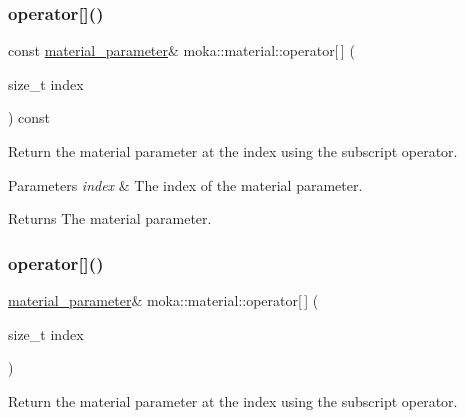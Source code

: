 \mbox{\label{classmoka_1_1material_acf1a2885fe704ce6684080c52f106f70}} 
\subsubsection{\texorpdfstring{operator[]()}{operator[]()}\hspace{0.1cm}{\footnotesize\ttfamily [1/3]}}
{\footnotesize\ttfamily const \mbox{\hyperlink{structmoka_1_1material__parameter}{material\+\_\+parameter}}\& moka\+::material\+::operator\mbox{[}$\,$\mbox{]} (\begin{DoxyParamCaption}\item[{size\+\_\+t}]{index }\end{DoxyParamCaption}) const}



Return the material parameter at the index using the subscript operator. 


\begin{DoxyParams}{Parameters}
{\em index} & The index of the material parameter. \\
\hline
\end{DoxyParams}
\begin{DoxyReturn}{Returns}
The material parameter. 
\end{DoxyReturn}
\mbox{\label{classmoka_1_1material_a9232eb8fae1ebace716db92e7bd118af}} 
\subsubsection{\texorpdfstring{operator[]()}{operator[]()}\hspace{0.1cm}{\footnotesize\ttfamily [2/3]}}
{\footnotesize\ttfamily \mbox{\hyperlink{structmoka_1_1material__parameter}{material\+\_\+parameter}}\& moka\+::material\+::operator\mbox{[}$\,$\mbox{]} (\begin{DoxyParamCaption}\item[{size\+\_\+t}]{index }\end{DoxyParamCaption})}



Return the material parameter at the index using the subscript operator. 


